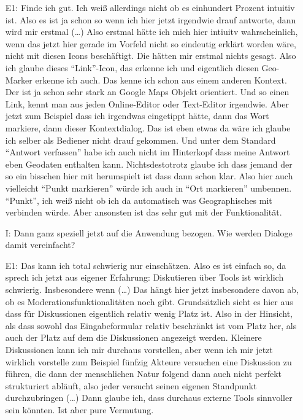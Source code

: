 \begin{itemize}
    \item[E1:] Finde ich gut. Ich wei{\ss} allerdings nicht ob es einhundert Prozent intuitiv ist. Also es ist ja schon so wenn ich hier jetzt irgendwie drauf antworte, dann wird mir erstmal (\dots) Also erstmal h{\"a}tte ich mich hier intiuitv wahrscheinlich, wenn das jetzt hier gerade im Vorfeld nicht so eindeutig erkl{\"a}rt worden w{\"a}re, nicht mit diesen Icons besch{\"a}ftigt. Die h{\"a}tten mir erstmal nichts gesagt. Also ich glaube dieses "`Link"'-Icon, das erkenne ich und eigentlich diesen Geo-Marker erkenne ich auch. Das kenne ich schon aus einem anderen Kontext. Der ist ja schon sehr stark an Google Maps Objekt orientiert. Und so einen Link, kennt man aus jeden Online-Editor oder Text-Editor irgendwie. Aber jetzt zum Beispiel dass ich irgendwas eingetippt h{\"a}tte, dann das Wort markiere, dann dieser Kontextdialog. Das ist eben etwas da w{\"a}re ich glaube ich selber als Bediener nicht drauf gekommen. Und unter dem Standard "`Antwort verfassen"' habe ich auch nicht im Hinterkopf dass meine Antwort eben Geodaten enthalten kann. Nichtsdestotrotz glaube ich dass jemand der so ein bisschen hier mit herumspielt ist dass dann schon klar. Also hier auch vielleicht "`Punkt markieren"' w{\"u}rde ich auch in "`Ort markieren"' umbennen. "`Punkt"', ich wei{\ss} nicht ob ich da automatisch was Geographisches mit verbinden w{\"u}rde. Aber ansonsten ist das sehr gut mit der Funktionalit{\"a}t.
    \item[I:] Dann ganz speziell jetzt auf die Anwendung bezogen. Wie werden Dialoge damit vereinfacht?
    \item[E1:] Das kann ich total schwierig nur einsch{\"a}tzen. Also es ist einfach so, da sprech ich jetzt aus eigener Erfahrung: Diskutieren {\"u}ber Tools ist wirklich schwierig. Insbesondere wenn (\dots) Das h{\"a}ngt hier jetzt insbesondere davon ab, ob es Moderationsfunktionalit{\"a}ten noch gibt. Grunds{\"a}tzlich sieht es hier aus dass f{\"u}r Diskussionen eigentlich relativ wenig Platz ist. Also in der Hinsicht, als dass sowohl das Eingabeformular relativ beschr{\"a}nkt ist vom Platz her, als auch der Platz auf dem die Diskussionen angezeigt werden. Kleinere Diskussionen kann ich mir durchaus vorstellen, aber wenn ich mir jetzt wirklich vorstelle zum Beispiel f{\"u}nfzig Akteure versuchen eine Diskussion zu f{\"u}hren, die dann der menschlichen Natur folgend dann auch nicht perfekt strukturiert abl{\"a}uft, also jeder versucht seinen eigenen Standpunkt durchzubringen (\dots) Dann glaube ich, dass durchaus externe Tools sinnvoller sein k{\"o}nnten. Ist aber pure Vermutung.

\end{itemize}
